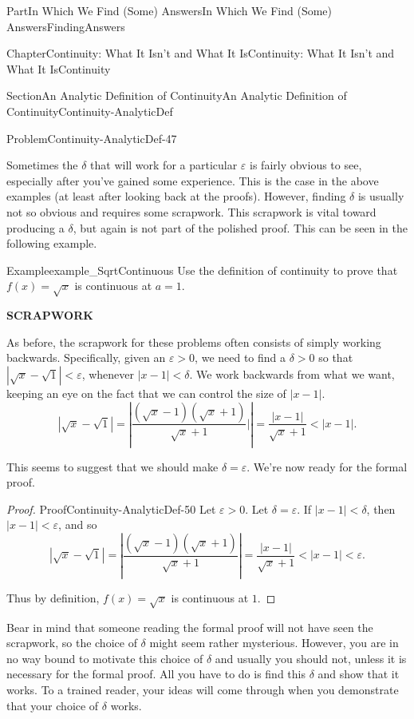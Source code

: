 \documentclass[oneside,10pt,]{book}
\newcommand{\terminology}[1]{\textbf{#1}}
\numberwithin{equation}{part}
\newcommand{\abs}[1]{\left|#1\right|}
\newcommand{\eps}{\varepsilon}
\newcommand{\lt}{<}
\begin{document}
\begin{partptx}{Part}{In Which We Find (Some) Answers}{}{In Which We Find (Some) Answers}{}{}{FindingAnswers}
\begin{chapterptx}{Chapter}{Continuity: What It Isn't and What It Is}{}{Continuity: What It Isn't and What It Is}{}{}{Continuity}
\begin{sectionptx}{Section}{An Analytic Definition of Continuity}{}{An Analytic Definition of Continuity}{}{}{Continuity-AnalyticDef}
\begin{problem}{Problem}{}{Continuity-AnalyticDef-47}
\end{problem}
Sometimes the \(\delta\) that will work for a particular \(\eps\) is fairly obvious to see, especially after you've gained some experience.  This is the case in the above examples (at least after looking back at the proofs).  However, finding \(\delta\) is usually not so obvious and requires some scrapwork.  This scrapwork is vital toward producing a \(\delta\), but again is not part of the polished proof. This can be seen in the following example.%
\begin{example}{Example}{}{example_SqrtContinuous}%
Use the definition of continuity to prove that \(f(x)=\sqrt{x}\) is continuous at \(a=1\).%
\par
\terminology{SCRAPWORK}%
\par
As before, the scrapwork for these problems often consists of simply working backwards.  Specifically, given an \(\eps>0\), we need to find a \(\delta>0\) so that \(\abs{\sqrt{x}-\sqrt{1}}\lt \eps\), whenever \(\abs{x-1}\lt
\delta\).  We work backwards from what we want, keeping an eye on the fact that we can control the size of \(\abs{x-1}\).%
\begin{equation*}
\abs{\sqrt{x}-\sqrt{1}}=\abs{\frac{\left(\sqrt{x}-1\right)\left(\sqrt{x}+1\right)}{\sqrt{x}+1}|}=\frac{\abs{x-1}}{\sqrt{x}+1}\lt
\abs{x-1}\text{.}
\end{equation*}
%
\par
This seems to suggest that we should make \(\delta=\eps\). We're now ready for the formal proof.%
\end{example}
\begin{proof}{Proof}{}{Continuity-AnalyticDef-50}
Let \(\eps>0\). Let \(\delta=\eps\). If \(\abs{x-1}\lt \delta\), then \(\abs{x-1}\lt \eps\), and so%
\begin{equation*}
\abs{\sqrt{x}-\sqrt{1}}=\abs{\frac{\left(\sqrt{x}-1\right)\left(\sqrt{x}+1\right)}{ \sqrt{x}+1}}=\frac{\abs{x-1}}{\sqrt{x}+1}\lt \abs{x-1}\lt \eps\text{.}
\end{equation*}
%
\par
Thus by definition, \(f(x)=\sqrt{x}\) is continuous at \(1\).%
\end{proof}
Bear in mind that someone reading the formal proof will not have seen the scrapwork, so the choice of \(\delta\) might seem rather mysterious.  However, you are in no way bound to motivate this choice of \(\delta\) and usually you should not, unless it is necessary for the formal proof.  All you have to do is find this \(\delta\) and show that it works.   To a trained reader, your ideas will come through when you demonstrate that your choice of \(\delta\) works.%

\end{sectionptx}
\end{chapterptx}
\end{partptx}
\end{document}

